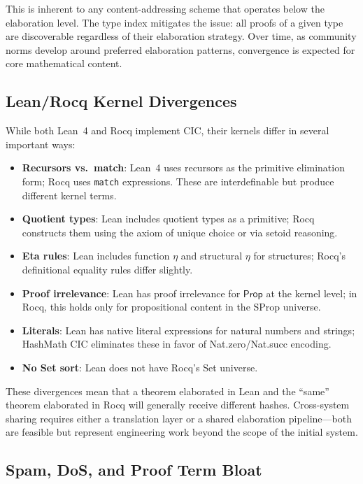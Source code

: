 \documentclass[11pt]{article}
\theoremstyle{definition}
\theoremstyle{plain}
\theoremstyle{remark}
\newcommand{\Prop}{\textsf{Prop}}
\begin{document}
This is inherent to any content-addressing scheme that operates below the elaboration level.
The type index mitigates the issue: all proofs of a given type are discoverable regardless
of their elaboration strategy.
Over time, as community norms develop around preferred elaboration patterns, convergence
is expected for core mathematical content.

\subsection{Lean/Rocq Kernel Divergences}
\label{sec:divergences}

While both Lean~4 and Rocq implement CIC, their kernels differ in several important ways:
\begin{itemize}[nosep]
  \item \textbf{Recursors vs.\ match}: Lean~4 uses recursors as the primitive elimination form;
    Rocq uses \texttt{match} expressions.
    These are interdefinable but produce different kernel terms.
  \item \textbf{Quotient types}: Lean includes quotient types as a primitive;
    Rocq constructs them using the axiom of unique choice or via setoid reasoning.
  \item \textbf{Eta rules}: Lean includes function $\eta$ and structural $\eta$ for structures;
    Rocq's definitional equality rules differ slightly.
  \item \textbf{Proof irrelevance}: Lean has proof irrelevance for $\Prop$ at the kernel level;
    in Rocq, this holds only for propositional content in the SProp universe.
  \item \textbf{Literals}: Lean has native literal expressions for natural numbers and strings;
    HashMath CIC eliminates these in favor of \textsf{Nat.zero}/\textsf{Nat.succ} encoding.
  \item \textbf{No \textsf{Set} sort}: Lean does not have Rocq's \textsf{Set} universe.
\end{itemize}
These divergences mean that a theorem elaborated in Lean and the ``same'' theorem elaborated
in Rocq will generally receive different hashes.
Cross-system sharing requires either a translation layer or a shared elaboration pipeline---both
are feasible but represent engineering work beyond the scope of the initial system.

\subsection{Spam, DoS, and Proof Term Bloat}
\label{sec:spam}
\end{document}
